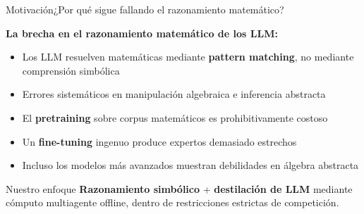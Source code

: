 \documentclass[aspectratio=169,10pt]{beamer}
\newcommand{\hl}[1]{\textcolor{AccentRed}{\textbf{#1}}}
\newcommand{\cy}[1]{\textcolor{AccentBlue}{\textbf{#1}}}
\begin{document}
\begin{frame}{Motivación}{¿Por qué sigue fallando el razonamiento matemático?}
  \begin{center}
    \begin{minipage}{0.72\textwidth}
      \vspace{2mm}

      \hspace*{\leftmargini}\cy{La brecha en el razonamiento matemático de los LLM:}

      \vspace{2mm}
      \begin{itemize}\setlength\itemsep{4pt}
        \item Los LLM resuelven matemáticas mediante \hl{pattern matching}, no mediante comprensión simbólica
        \item Errores sistemáticos en manipulación algebraica e inferencia abstracta
        \item El \textbf{pretraining} sobre corpus matemáticos es prohibitivamente costoso
        \item Un \textbf{fine-tuning} ingenuo produce expertos demasiado estrechos
        \item Incluso los modelos más avanzados muestran debilidades en álgebra abstracta
      \end{itemize}

      \vspace{3mm}
      \begin{block}{Nuestro enfoque}
        \textbf{Razonamiento simbólico} + \textbf{destilación de LLM} mediante
        cómputo multiagente offline, dentro de restricciones estrictas de competición.
      \end{block}
    \end{minipage}
  \end{center}
\end{frame}
\end{document}
